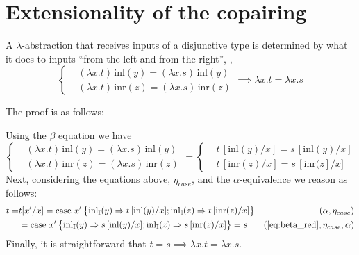 \section{Extensionality of the copairing}

A $\lambda$-abstraction that receives inputs of a disjunctive type is determined by what it does to inputs ``from the left and from the right'', \ie,
\[
\left\{
\begin{aligned}
&(\lambda x.t)\, \text{inl}(y) = (\lambda x.s)\, \text{inl}(y) \\
&(\lambda x.t)\, \text{inr}(z) =(\lambda x.s)\, \text{inr}(z)
\end{aligned}
\right.
\implies \lambda x.t = \lambda x.s
\]

The proof is as follows:

Using the $\beta$ equation we have
\begin{equation} \label{eq:beta_red}
  \left\{
\begin{aligned}
&(\lambda x.t)\, \text{inl}(y) = (\lambda x.s)\, \text{inl}(y) \\
&(\lambda x.t)\, \text{inr}(z) =(\lambda x.s)\, \text{inr}(z)
\end{aligned}
\right.
= \left\{
\begin{aligned}
&t\,[\text{inl}(y)/x]  = s\, [\text{inl}(y)/x] \\
&t\,[\text{inr}(z)/x]  = s\, [\text{inr}(z]/x] 
\end{aligned}
\right.
\end{equation}
Next, considering the equations above, $\eta_{case}$, and the $\alpha$-equivalence we reason as follows:
\begin{equation*}
\begin{split}
  t = & t[x'/x] = \text{case } x'  
    \left\{ \begin{aligned}
    \inl_{\typeI}(y) \Rightarrow t\,[\text{inl}(y)/x] ;  
    \inl_{\typeI}(z) \Rightarrow t\,[\text{inr}(z)/x]
  \end{aligned}  \right\} & (\alpha,\eta_{case})\\
  & = \text{case } x'  
    \left\{ \begin{aligned}
    \inl_{\typeI}(y) \Rightarrow s\,[\text{inl}(y)/x] ;  
    \inl_{\typeI}(z) \Rightarrow s\,[\text{inr}(z)/x]
  \end{aligned}  \right\} = s & (\text{\autoref{eq:beta_red}},\eta_{case},\alpha)
\end{split}
\end{equation*}
Finally, it is straightforward that $ t=s \implies \lambda x.t = \lambda x.s$.

